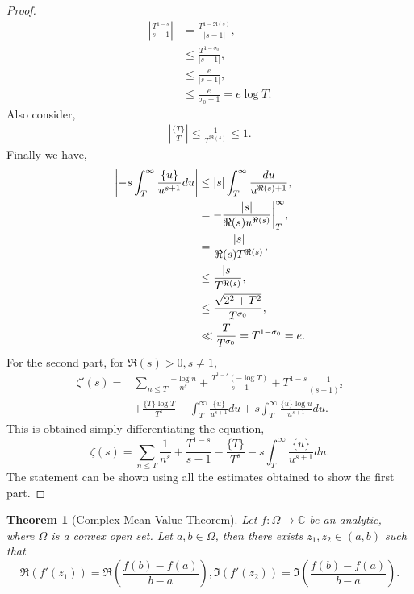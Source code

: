 \documentclass{article}
\newtheorem{theorem}{Theorem} [section]
\newcommand{\C}[0]{\mathbb{C}}
\begin{document}
\begin{proof}
\begin{align*}
      \left\vert{\frac {T^{1-s}} {s-1}}\right\vert & = {\frac {T^{1-\Re(s)}} {\vert s-1\vert}},\\
      & \leq {\frac {T^{1-\sigma_0}} {\vert s-1\vert}},\\
      & \leq {\frac e {\vert s-1\vert}},\\
      & \leq {\frac e {\sigma_0-1}} =e\log T.
    \end{align*}
    Also consider,
    \begin{align*}
      \left\vert{\frac {\{T\}} {T}}\right\vert \leq {\frac 1 {T^{\Re(s)}}}\leq 1. 
    \end{align*}
    Finally we have,
    \begin{align*}
      \left\vert -s\int_T^\infty {\frac {\{u\}} {u^{s+1}}}du\right\vert& \leq \vert s\vert\int_T^\infty {\frac {du} {u^{\Re(s)+1}}},\\
      & = -{\frac {\vert s\vert} {\Re(s)u^{\Re(s)}}}\bigg{\vert}_T^\infty,\\
      & = {\frac {\vert s\vert} {\Re(s)T^{\Re(s)}}} ,\\
      & \leq {\frac {\vert s\vert} {T^{\Re(s)}}},\\
      & \leq {\frac {\sqrt{2^2+T^2}} {T^{\sigma_0}}},\\
      & \ll  {\frac T {T^{\sigma_0}}} = T^{1-\sigma_0} = e.
    \end{align*}
    For the second part, for $\Re(s)>0,s\not=1$,
    \begin{align*}
      \zeta'(s) = &\sum_{n\leq T}{\frac {-\log n} {n^s}}+{\frac {T^{1-s}(-\log T)} {s-1}}+T^{1-s}{\frac {-1} {(s-1)^2}}\\
      &+{\frac {\{T\}\log T} {T^s}}-\int_T^\infty {\frac {\{u\}} {u^{s+1}}}du + s\int_T^\infty {\frac {\{u\}\log u} {u^{s+1}}}du.
    \end{align*}
    This is obtained simply differentiating the equation,
    \begin{equation*}
      \zeta(s) = \sum_{n\leq T}{\frac 1 {n^s}}+{\frac {T^{1-s}} {s-1}}-{\frac {\{T\}} {T^s}}-s\int_T^\infty {\frac {\{u\}} {u^{s+1}}}du.
    \end{equation*}
    The statement can be shown using all the estimates obtained to show the first part.
  \end{proof}

  \begin{theorem}[Complex Mean Value Theorem]
    Let $f:\Omega\to \C$ be an analytic, where $\Omega$ is a convex open set. Let $a,b\in\Omega$, then there exists $z_1,z_2\in (a,b)$ such that 
    \begin{equation*}
      \Re(f'(z_1)) = \Re\left({\frac {f(b)-f(a)} {b-a}}\right), \Im(f'(z_2)) = \Im\left({\frac {f(b)-f(a)} {b-a}}\right).
    \end{equation*}
    \label{theorem_complex_mean_value}
  \end{theorem}
\end{document}

